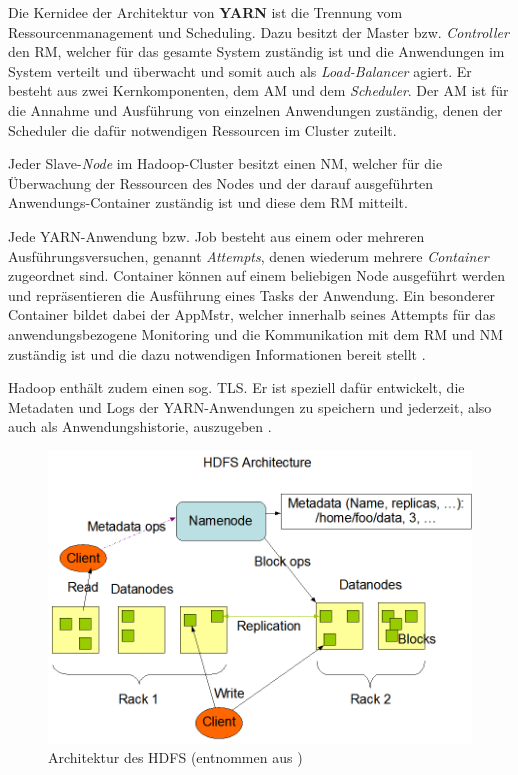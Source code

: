 Die Kernidee der Architektur von \textbf{YARN} ist die Trennung vom Ressourcenmanagement und Scheduling. Dazu besitzt der Master bzw. \emph{Controller} den \ac{RM}, welcher für das gesamte System zuständig ist und die Anwendungen im System verteilt und überwacht und somit auch als \emph{Load-Balancer} agiert. Er besteht aus zwei Kernkomponenten, dem \ac{AM} und dem \emph{Scheduler}. Der \ac{AM} ist für die Annahme und Ausführung von einzelnen Anwendungen zuständig, denen der Scheduler die dafür notwendigen Ressourcen im Cluster zuteilt.

Jeder Slave-\emph{Node} im Hadoop-Cluster besitzt einen \ac{NM}, welcher für die Überwachung der Ressourcen des Nodes und der darauf ausgeführten Anwendungs-Container zuständig ist und diese dem \ac{RM} mitteilt.

Jede YARN-Anwendung bzw. Job besteht aus einem oder mehreren Ausführungsversuchen, genannt \emph{Attempts}, denen wiederum mehrere \emph{Container} zugeordnet sind. Container können auf einem beliebigen Node ausgeführt werden und repräsentieren die Ausführung eines Tasks der Anwendung. Ein besonderer Container bildet dabei der \ac{AppMstr}, welcher innerhalb seines Attempts für das anwendungsbezogene Monitoring und die Kommunikation mit dem \ac{RM} und \ac{NM} zuständig ist und die dazu notwendigen Informationen bereit stellt \cite{HadoopYarnArch271}.

Hadoop enthält zudem einen sog. \ac{TLS}. Er ist speziell dafür entwickelt, die Metadaten und Logs der YARN-Anwendungen zu speichern und jederzeit, also auch als Anwendungshistorie, auszugeben \cite{HadoopYarnTlServer271}.

\begin{figure}
    \includegraphics{./images/hdfsarchitecture.png}
    \caption[Architektur des HDFS]{Architektur des \acs{HDFS} (entnommen aus \cite{HadoopHdfsDesc271})}
    \label{fig:hdfsarch}
\end{figure}


